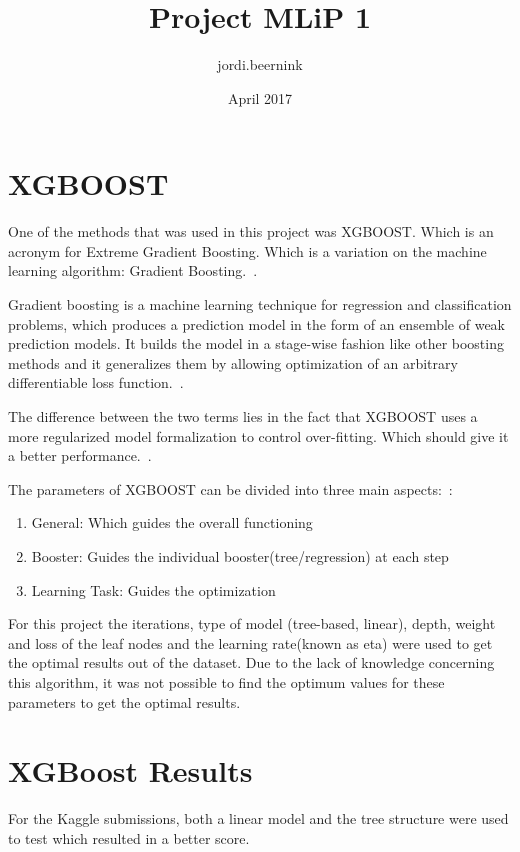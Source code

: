 \documentclass{article}
\title{Project MLiP 1}
\author{jordi.beernink }
\date{April 2017}
\begin{document}
\maketitle

\section{XGBOOST}

One of the methods that was used in this project was XGBOOST. Which is an acronym for Extreme Gradient Boosting. Which is a variation on the machine learning algorithm: Gradient Boosting.~\cite{Chen Tianqi, 2015}. 

Gradient boosting is a machine learning technique for regression and classification problems, which produces a prediction model in the form of an ensemble of weak prediction models. It builds the model in a stage-wise fashion like other boosting methods and it generalizes them by allowing optimization of an arbitrary differentiable loss function.~\cite{Chen Tianqi, 2015}.


The difference between the two terms lies in the fact that XGBOOST uses a more regularized model formalization to control over-fitting. Which should give it a better performance.~\cite{Chen Tianqi, 2014}. 

The parameters of XGBOOST can be divided into three main aspects:~\cite{Aarshay Jain, 2016}: 

\begin{enumerate}
    \item General: Which guides the overall functioning
    \item Booster: Guides the individual booster(tree/regression) at each step
    \item Learning Task: Guides the optimization
\end{enumerate}

For this project the iterations, type of model (tree-based, linear), depth, weight and loss of the leaf nodes and the learning rate(known as eta) were used to get the optimal results out of the dataset. Due to the lack of knowledge concerning this algorithm, it was not possible to find the optimum values for these parameters to get the optimal results.  

\section{XGBoost Results}
For the Kaggle submissions, both a linear model and the tree structure were used to test which resulted in a better score.
\end{document}
